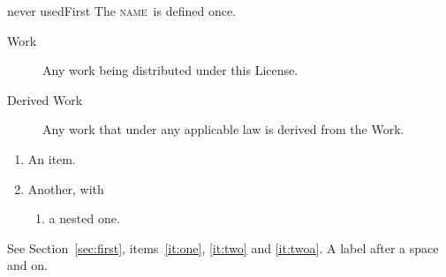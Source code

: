 \documentclass{article}
\providecommand{\Name}{\textsc{name}}
\providecommand{\section}{never used}
\begin{document}
\section{First}\label{sec:first}
The \Name\ is defined once.
\begin{description}
\item[Work] Any work being distributed under this License.
\item[Derived Work] Any work that under any applicable law is
  derived from the Work.
\end{description}
\begin{enumerate}
\item\label{it:one} An item.
\item\label{it:two} Another, with
  \begin{enumerate}
  \item\label{it:twoa} a nested one.
  \end{enumerate}
\end{enumerate}
See Section~\ref{sec:first}, items~\ref{it:one}, \ref{it:two} and \ref{it:twoa}. A label after a space \label{x} and on.
\end{document}
